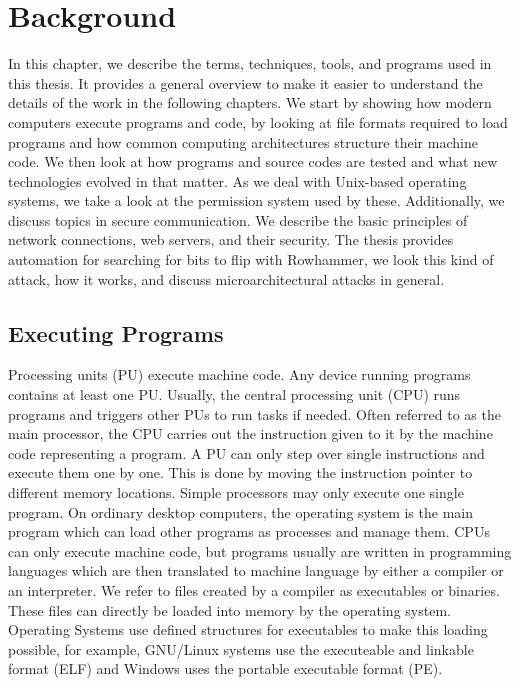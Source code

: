 \chapter{Background}\label{sec:general}

In this chapter, we describe the terms, techniques, tools, and programs used in
this thesis. It provides a general overview to make it easier to understand the
details of the work in the following chapters. We start by showing how modern
computers execute programs and code, by looking at file formats required to
load programs and how common computing architectures structure their machine
code. We then look at how programs and source codes are tested and what new
technologies evolved in that matter. As we deal with Unix-based operating
systems, we take a look at the permission system used by these. Additionally,
we discuss topics in secure communication. We describe the basic principles of
network connections, web servers, and their security. The thesis provides
automation for searching for bits to flip with Rowhammer, we look this kind of
attack, how it works, and discuss microarchitectural attacks in general.

\section{Executing Programs}

Processing units (PU) execute machine code. Any device running programs contains
at least one PU. Usually, the central processing unit (CPU) runs programs and
triggers other PUs to run tasks if needed. Often referred to as the main
processor, the CPU carries out the instruction given to it by the machine code
representing a program. A PU can only step over single instructions and execute
them one by one. This is done by moving the instruction pointer to different
memory locations. Simple processors may only execute one single program. On
ordinary desktop computers, the operating system is the main program which can
load other programs as processes and manage them. CPUs can only execute machine
code, but programs usually are written in programming languages which are then
translated to machine language by either a compiler or an interpreter. We refer
to files created by a compiler as executables or binaries. These files can
directly be loaded into memory by the operating system. Operating Systems use
defined structures for executables to make this loading possible, for example,
GNU/Linux systems use the executeable and linkable format (ELF) and Windows
uses the portable executable format (PE).

